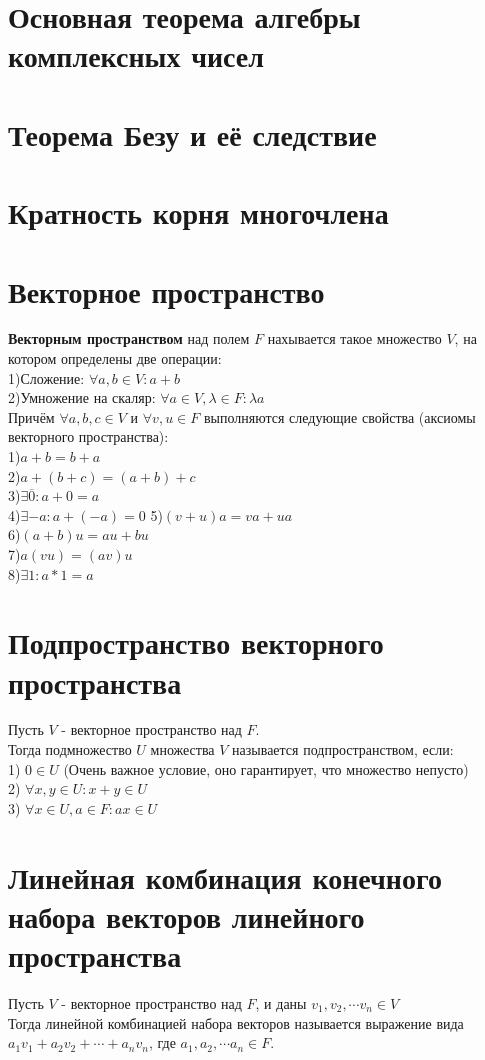 \documentclass[a4paper,11pt]{report}
\begin{document}
\section{Основная теорема алгебры комплексных чисел}
\section{Теорема Безу и её следствие}
\section{Кратность корня многочлена}
\section{Векторное пространство}
\textbf{Векторным пространством} над полем $F$ нахывается такое множество $V$, на котором определены две операции:\\
1)Сложение: $\forall a, b \in V: a + b$\\
2)Умножение на скаляр: $\forall a \in V, \lambda \in F: \lambda{a} $\\
Причём $\forall a, b, c \in V$ и $\forall v, u \in F$ выполняются следующие свойства (аксиомы векторного пространства):\\
1)$a + b = b+ a$\\
2)$a + (b +c) = (a + b) + c $\\
3)$\exists \overline{0}: a + 0 = a$\\
4)$\exists -a: a + (-a) = 0$
5)$(v + u)a = va + ua$\\
6)$(a + b)u = au + bu$\\
7)$a(vu) = (av)u$\\
8)$\exists 1: a * 1 = a $\\
\section{Подпространство векторного пространства}
Пусть $V$ - векторное пространство над $F$.\\
Тогда подмножество $U$ множества $V$ называется подпространством, если:\\
1) $0 \in U$ (Очень важное условие, оно гарантирует, что множество непусто)\\ 
2) $\forall x, y \in U: x + y \in U$\\
3) $\forall x \in U, a \in F: ax \in U$\\
\section{Линейная комбинация конечного набора векторов линейного пространства}
Пусть $V$ - векторное пространство над $F$, и даны $v_1, v_2, \cdots v_n \in V$\\
Тогда линейной комбинацией набора векторов называется выражение вида 
$a_1v_1 + a_2v_2 + \cdots + a_nv_n$, где $a_1, a_2, \cdots a_n \in F$.
\end{document}
